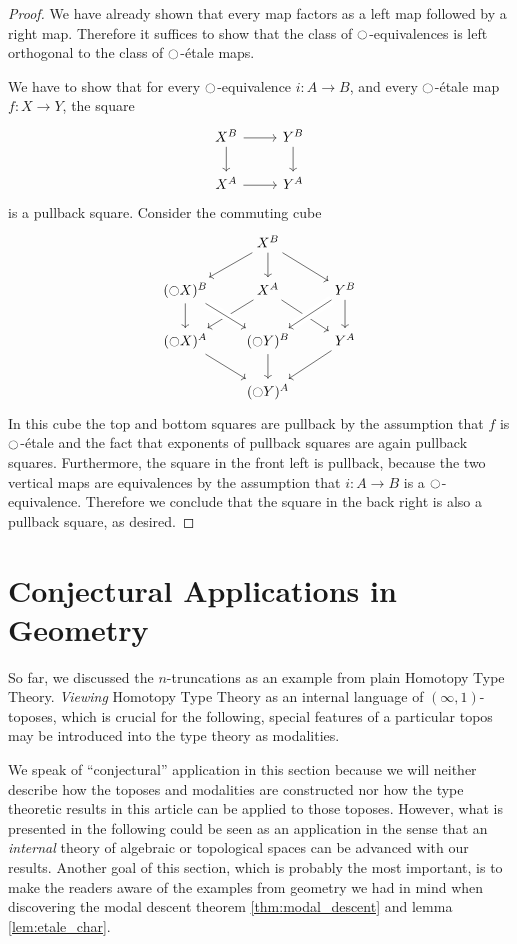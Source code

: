 \documentclass[9pt,twosided]{amsart}
\begin{document}
\begin{proof}
  We have already shown that every map factors as a left map followed by a right map. Therefore it suffices to show that the class of ${\ocircle}$-equivalences is left orthogonal to the class of ${\ocircle}$-\'etale maps.
  
We have to show that for every ${\ocircle}$-equivalence $i:A\to B$, and every ${\ocircle}$-\'etale map $f:X\to Y$, the square
\begin{equation*}
\begin{tikzcd}
X^B \arrow[r] \arrow[d] & Y^B \arrow[d] \\
X^A \arrow[r] & Y^A
\end{tikzcd}
\end{equation*}
is a pullback square. Consider the commuting cube
\begin{equation*}
\begin{tikzcd}
&[-1ex] X^B \arrow[dl] \arrow[d] \arrow[dr] \\
(\modal X)^B \arrow[d] & X^A \arrow[dl] \arrow[dr] & Y^B \arrow[d] \arrow[dl,crossing over] \\
(\modal X)^A \arrow[dr] & (\modal Y)^B \arrow[from=ul,crossing over] \arrow[d] & Y^A \arrow[dl] \\
& (\modal Y)^A
\end{tikzcd}
\end{equation*}
In this cube the top and bottom squares are pullback by the assumption that $f$ is ${\ocircle}$-\'etale and the fact that exponents of pullback squares are again pullback squares. Furthermore, the square in the front left is pullback, because the two vertical maps are equivalences by the assumption that $i:A\to B$ is a ${\ocircle}$-equivalence. Therefore we conclude that the square in the back right is also a pullback square, as desired.
\end{proof}

\section{Conjectural Applications in Geometry}

So far, we discussed the $n$-truncations as an example from plain Homotopy Type Theory.
\emph{Viewing} Homotopy Type Theory as an internal language of $(\infty,1)$-toposes,
which is crucial for the following,
special features of a particular topos may be introduced into the type theory as modalities.

We speak of ``conjectural'' application in this section because we will neither describe how the toposes and modalities are constructed nor how the type theoretic results in this article can be applied to those toposes.
However, what is presented in the following could be seen as an application in the sense that an \emph{internal} theory of algebraic or topological spaces can be advanced with our results.
Another goal of this section, which is probably the most important, is to make the readers aware of the examples from geometry we had in mind when discovering the modal descent theorem \ref{thm:modal_descent} and lemma \ref{lem:etale_char}.
\end{document}
